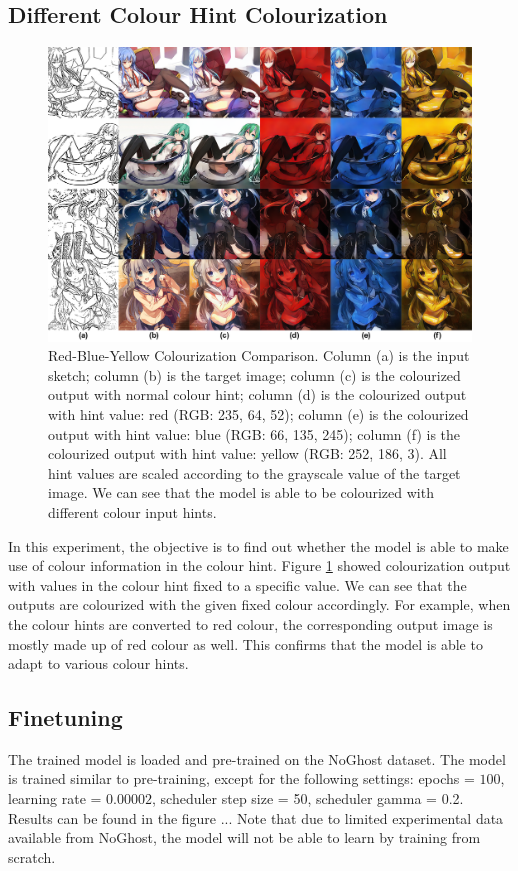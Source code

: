 \subsection{Different Colour Hint Colourization}
\begin{figure}
    \centering
    \includegraphics[width=1.0\textwidth]{images/colorization/RYB_comparison.png}
    \caption[Red-Blue-Yellow Colourization Comparison.]{Red-Blue-Yellow Colourization Comparison. Column (a) is the input sketch; column (b) is the target image; column (c) is the colourized output with normal colour hint; column (d) is the colourized output with hint value: red (RGB: 235, 64, 52); column (e) is the colourized output with hint value: blue (RGB: 66, 135, 245); column (f) is the colourized output with hint value: yellow (RGB: 252, 186, 3). All hint values are scaled according to the grayscale value of the target image. We can see that the model is able to be colourized with different colour input hints.}
    \label{fig:ryb_comparison}
\end{figure}
In this experiment, the objective is to find out whether the model is able to make use of colour information in the colour hint. Figure \ref{fig:ryb_comparison} showed colourization output with values in the colour hint fixed to a specific value. We can see that the outputs are colourized with the given fixed colour accordingly. For example, when the colour hints are converted to red colour, the corresponding output image is mostly made up of red colour as well. This confirms that the model is able to adapt to various colour hints.

\subsection{Finetuning}
The trained model is loaded and pre-trained on the NoGhost dataset. The model is trained similar to pre-training, except for the following settings: epochs = $100$, learning rate = $0.00002$, scheduler step size = 50, scheduler gamma = 0.2. Results can be found in the figure ... Note that due to limited experimental data available from NoGhost, the model will not be able to learn by training from scratch.


